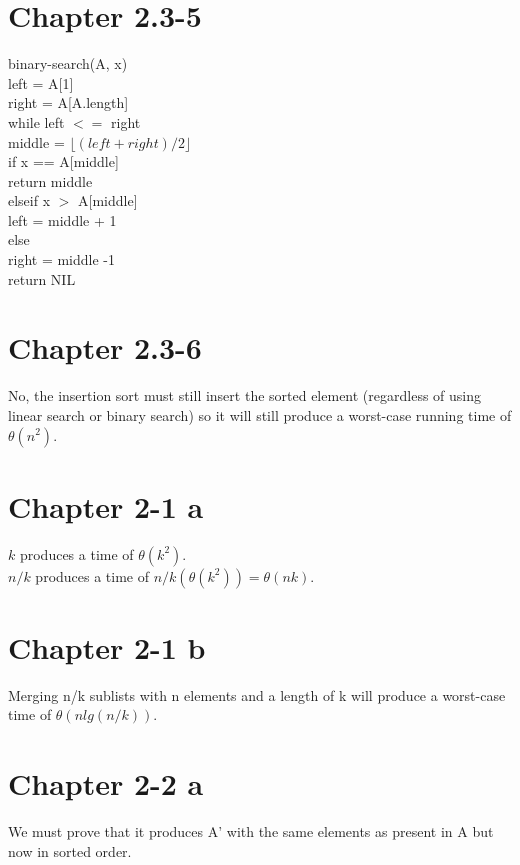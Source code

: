 \documentclass[12pt]{article}
\newcommand\tab[1][1cm]{\hspace*{#1}}
\begin{document}
\section{Chapter 2.3-5}

binary-search(A, x) \\
left = A[1] \\
right = A[A.length] \\
while left $<=$ right \\
\tab middle = $\lfloor{(left + right) / 2}\rfloor$ \\
\tab if x == A[middle] \\
\tab \tab return middle \\
\tab elseif x $>$ A[middle] \\
\tab \tab left = middle + 1 \\
\tab else \\
\tab \tab right = middle -1 \\
return NIL


\section{Chapter 2.3-6}

No, the insertion sort must still insert the sorted element (regardless of using linear search or binary search) so it will still produce a worst-case running time of $\theta(n^2)$.

\section{Chapter 2-1 a}

$k$ produces a time of $\theta(k^2)$. \\
$n/k$ produces a time of $n/k(\theta(k^2)) = \theta(nk)$.

\section{Chapter 2-1 b}

Merging n/k sublists with n elements and a length of k will produce a worst-case time of $\theta(nlg(n/k))$.

\section{Chapter 2-2 a}

We must prove that it produces A' with the same elements as present in A but now in sorted order.
\end{document}
